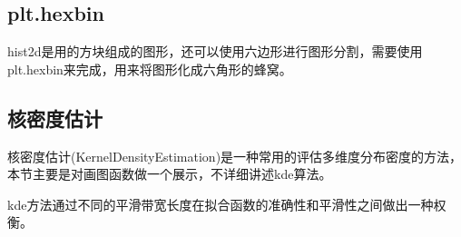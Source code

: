 \documentclass[letterpaper,10pt,english]{sphinxhowto}
\begin{document}
\subsection{plt.hexbin}
\label{\detokenize{_u76f4_u65b9_u56fe:plt-hexbin}}
hist2d是用的方块组成的图形，还可以使用六边形进行图形分割，需要使用plt.hexbin来完成，用来将图形化成六角形的蜂窝。

%
\begin{sphinxVerbatim}[commandchars=\\\{\}]
   
  
\end{sphinxVerbatim}



\subsection{核密度估计}
\label{\detokenize{_u76f4_u65b9_u56fe:id4}}
核密度估计(KernelDensityEstimation)是一种常用的评估多维度分布密度的方法，本节主要是对画图函数做一个展示，不详细讲述kde算法。

kde方法通过不同的平滑带宽长度在拟合函数的准确性和平滑性之间做出一种权衡。
\end{document}
